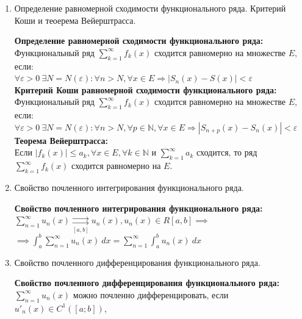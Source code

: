 \documentclass[a4paper, 12pt]{article}
\begin{document}
\begin{enumerate}
\begin{mdframed}
	      \end{mdframed}
	\item Определение равномерной сходимости функционального ряда. Критерий Коши и теоерема Вейерштрасса. \\
	      \begin{mdframed}
		      \textbf{Определение равномерной сходимости функционального ряда:} \\
		      Функциональный ряд $\sum_{k=1}^{\infty} f_k(x)$ сходится равномерно на множестве $E$, если: \\
		      $\forall \varepsilon > 0 \ \exists N = N(\varepsilon): \forall n > N, \forall x \in E \Rightarrow |S_n(x) - S(x)| < \varepsilon$ \\
		      \textbf{Критерий Коши равномерной сходимости функционального ряда:} \\
		      Функциональный ряд $\sum_{k=1}^{\infty} f_k(x)$ сходится равномерно на множестве $E$, если: \\
		      $\forall \varepsilon > 0 \ \exists N = N(\varepsilon): \forall n > N, \forall p \in \mathbb{N}, \forall x \in E \Rightarrow |S_{n+p}(x) - S_n(x)| < \varepsilon$ \\
		      \textbf{Теорема Вейерштрасса:} \\
		      Если $|f_k(x)| \le a_k, \forall x \in E, \forall k \in \mathbb{N}$ и $\sum_{k=1}^{\infty} a_k$ сходится, то ряд $\sum_{k=1}^{\infty} f_k(x)$ сходится равномерно на $E$.
	      \end{mdframed}
	\item Свойство почленного интегрирования функционального ряда. \\
	      \begin{mdframed}
		      \textbf{Свойство почленного интегрирования функционального ряда:} \\
		      $\sum_{n=1}^{\infty} u_n(x) \underset{[a,b]}\rightrightarrows u_n(x), u_n(x) \in R[a,b] \implies$ \\
		      $\implies \int_{{a}}^{{b}} {\sum_{n=1}^{\infty} u_n(x)} \: d{x} {} = \sum_{n=1}^{\infty} \int_{{a}}^{{b}} {u_n(x)} \: d{x}$
	      \end{mdframed}
	\item Свойство почленного дифференцирования функционального ряда. \\
	      \begin{mdframed}
		      \textbf{Свойство почленного дифференцирования функционального ряда:} \\
		      $\sum_{n=1}^{\infty} u_n(x)$ можно почленно дифференцировать, если $u'_n(x) \in C^{1}([a;b])$, \\

\end{mdframed}
\end{enumerate}
\end{document}
